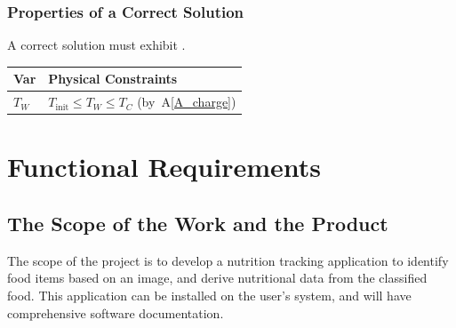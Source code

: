 \documentclass[12pt]{article}
\newcommand{\aref}[1]{A\ref{#1}}
\begin{document}
\subsubsection{Properties of a Correct Solution} \label{sec_CorrectSolution}

\noindent
A correct solution must exhibit .  

\begin{table}[!h]
\caption{Output Variables} \label{TblOutputVar}
\renewcommand{\arraystretch}{1.2}
\noindent \begin{longtable*}{l l} 
  \toprule
  \textbf{Var} & \textbf{Physical Constraints} \\
  \midrule 
  $T_W$ & $T_\text{init} \leq T_W \leq T_C$ (by~\aref{A_charge})
  \\
  \bottomrule
\end{longtable*}
\end{table}


\section{Functional Requirements}

\subsection{The Scope of the Work and the Product}

The scope of the project is to develop a nutrition tracking application to identify food items based on an image, and derive nutritional data from the classified food. This application can be installed on the user's system, and will have comprehensive software documentation.
\end{document}
